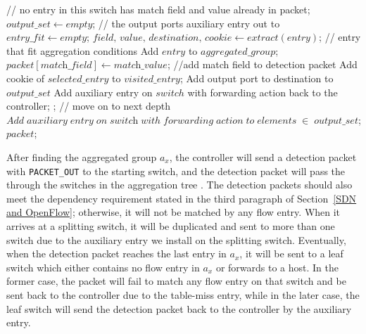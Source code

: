 \begin {tcolorbox}[blanker,float=tbp,
grow to left by=1cm, grow to right by=1cm]
\begin{algorithm}[H]
  \begin{algorithmic}[1]
      \State // no entry in this switch has match field and value already in packet;
      \State $\textit{output\_set} \gets empty$;  //  the output ports auxiliary entry out to
      \State $\textit{entry\_fit} \gets empty$; 
        \State $\textit{field, value, destination, cookie} \gets extract(\textit{entry})$;
          //  entry that fit aggregation conditions
          \State Add $entry$ to $aggregated\_group$;
          \State $\textit{packet}[\textit{match\_field}] \gets \textit{match\_value}$;  //add match field to detection packet
          \State Add cookie of $selected\_entry$ to $visited\_entry$;
          \State Add output port to destination to $output\_set$
            \State Add auxiliary entry on $switch$ with forwarding action back to the controller;
          \EndIf
          \State {}; // move on to next depth
        \EndIf
      \EndFor
        \State $Add\;auxiliary\;entry\;on\;\textit{switch}\;with\;forwarding\;action\;to\;elements\;\in\;
        \textit{output\_set}$;
      \EndIf
      \State \Return $packet$;
    \EndFunction
\end{algorithmic}
\end{algorithm}
\end{tcolorbox}

After finding the aggregated group $a_x$, the controller will send a detection packet with \texttt{PACKET\_OUT} to the starting switch, and the detection packet will pass the through the switches in the aggregation tree \sout{}. The detection packets should also meet the dependency requirement stated in the third paragraph of Section~\ref{SDN and OpenFlow}; otherwise, it will not be matched by any flow entry. When it arrives at a splitting switch, it will be duplicated and sent to more than one switch due to the auxiliary entry we install on the splitting switch. Eventually, when the detection packet reaches the last entry in $a_x$, it will be sent to a leaf switch which either contains no flow entry in $a_x$ or forwards to a host. In the former case, the packet will fail to match any flow entry on that switch and be sent back to the controller due to the table-miss entry, while in the later case, the leaf switch will send the detection packet back to the controller by the auxiliary entry. 

